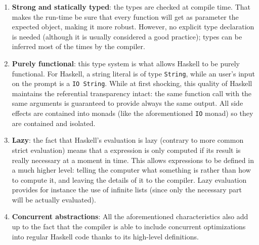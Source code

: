 \begin{enumerate}
\item \textbf{Strong and statically typed}: the types are checked at compile
  time. That makes the run-time be sure that every function will get as
  parameter the expected object, making it more robust. However, no explicit
  type declaration is needed (although it is usually considered a good
  practice); types can be inferred most of the times by the compiler.
\item \textbf{Purely functional}: this type system is what allows Haskell to be
  purely functional. For Haskell, a string literal is of type \texttt{String},
  while an user's input on the prompt is a \texttt{IO String}. While at first
  shocking, this quality of Haskell maintains the referential transparency
  intact: the same function call with the same arguments is guaranteed to
  provide always the same output. All side effects are contained into monads
  (like the aforementioned \texttt{IO} monad) so they are contained and
  isolated.
\item \textbf{Lazy}: the fact that Haskell's evaluation is lazy (contrary to
  more common strict evaluation) means that a expression is only computed if
  its result is really necessary at a moment in time. This allows expressions
  to be defined in a much higher level: telling the computer what something is
  rather than how to compute it, and leaving the details of it to the compiler.
  Lazy evaluation provides for instance the use of infinite lists (since only
  the necessary part will be actually evaluated).
\item \textbf{Concurrent abstractions}: All the aforementioned characteristics
  also add up to the fact that the compiler is able to include concurrent
  optimizations into regular Haskell code thanks to its high-level definitions.
\end{enumerate}
  
\newpage